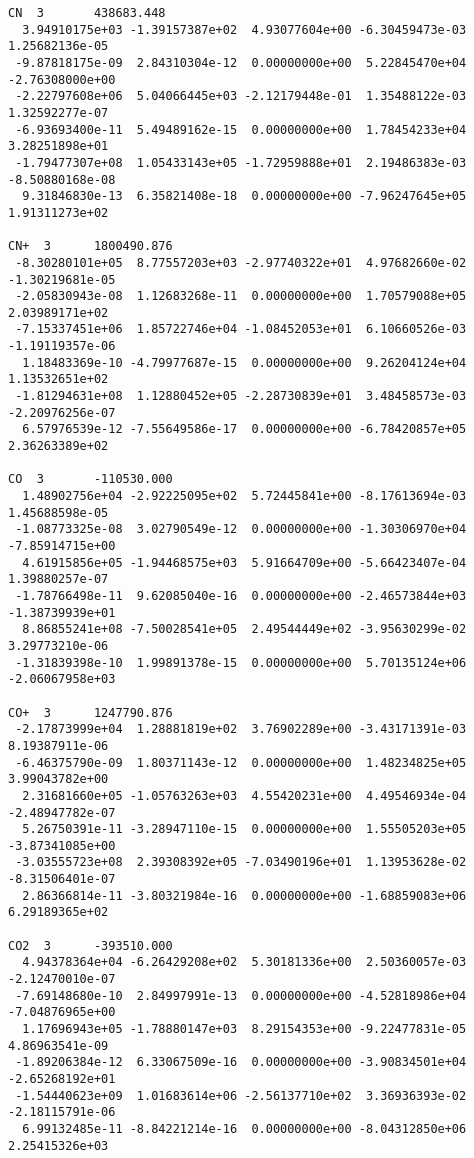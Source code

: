 \begin{verbatim}
CN  3		438683.448							 
  3.94910175e+03 -1.39157387e+02  4.93077604e+00 -6.30459473e-03  1.25682136e-05
 -9.87818175e-09  2.84310304e-12  0.00000000e+00  5.22845470e+04 -2.76308000e+00
 -2.22797608e+06  5.04066445e+03 -2.12179448e-01  1.35488122e-03  1.32592277e-07
 -6.93693400e-11  5.49489162e-15  0.00000000e+00  1.78454233e+04  3.28251898e+01
 -1.79477307e+08  1.05433143e+05 -1.72959888e+01  2.19486383e-03 -8.50880168e-08
  9.31846830e-13  6.35821408e-18  0.00000000e+00 -7.96247645e+05  1.91311273e+02
										 
CN+  3		1800490.876						         
 -8.30280101e+05  8.77557203e+03 -2.97740322e+01  4.97682660e-02 -1.30219681e-05
 -2.05830943e-08  1.12683268e-11  0.00000000e+00  1.70579088e+05  2.03989171e+02
 -7.15337451e+06  1.85722746e+04 -1.08452053e+01  6.10660526e-03 -1.19119357e-06
  1.18483369e-10 -4.79977687e-15  0.00000000e+00  9.26204124e+04  1.13532651e+02
 -1.81294631e+08  1.12880452e+05 -2.28730839e+01  3.48458573e-03 -2.20976256e-07
  6.57976539e-12 -7.55649586e-17  0.00000000e+00 -6.78420857e+05  2.36263389e+02
										 
CO  3		-110530.000							 
  1.48902756e+04 -2.92225095e+02  5.72445841e+00 -8.17613694e-03  1.45688598e-05
 -1.08773325e-08  3.02790549e-12  0.00000000e+00 -1.30306970e+04 -7.85914715e+00
  4.61915856e+05 -1.94468575e+03  5.91664709e+00 -5.66423407e-04  1.39880257e-07
 -1.78766498e-11  9.62085040e-16  0.00000000e+00 -2.46573844e+03 -1.38739939e+01
  8.86855241e+08 -7.50028541e+05  2.49544449e+02 -3.95630299e-02  3.29773210e-06
 -1.31839398e-10  1.99891378e-15  0.00000000e+00  5.70135124e+06 -2.06067958e+03
										 
CO+  3		1247790.876						         
 -2.17873999e+04  1.28881819e+02  3.76902289e+00 -3.43171391e-03  8.19387911e-06
 -6.46375790e-09  1.80371143e-12  0.00000000e+00  1.48234825e+05  3.99043782e+00
  2.31681660e+05 -1.05763263e+03  4.55420231e+00  4.49546934e-04 -2.48947782e-07
  5.26750391e-11 -3.28947110e-15  0.00000000e+00  1.55505203e+05 -3.87341085e+00
 -3.03555723e+08  2.39308392e+05 -7.03490196e+01  1.13953628e-02 -8.31506401e-07
  2.86366814e-11 -3.80321984e-16  0.00000000e+00 -1.68859083e+06  6.29189365e+02
										 
CO2  3		-393510.000						         
  4.94378364e+04 -6.26429208e+02  5.30181336e+00  2.50360057e-03 -2.12470010e-07
 -7.69148680e-10  2.84997991e-13  0.00000000e+00 -4.52818986e+04 -7.04876965e+00
  1.17696943e+05 -1.78880147e+03  8.29154353e+00 -9.22477831e-05  4.86963541e-09
 -1.89206384e-12  6.33067509e-16  0.00000000e+00 -3.90834501e+04 -2.65268192e+01
 -1.54440623e+09  1.01683614e+06 -2.56137710e+02  3.36936393e-02 -2.18115791e-06
  6.99132485e-11 -8.84221214e-16  0.00000000e+00 -8.04312850e+06  2.25415326e+03
										 

\end{verbatim}
